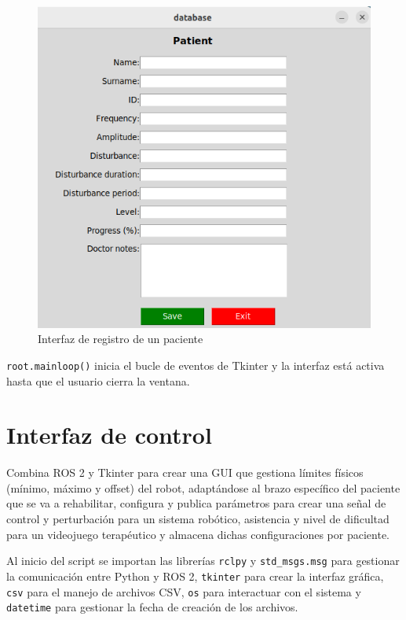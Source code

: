\begin{figure}[ht!]
	\centering
	\begin{minipage}{0.65\linewidth}
		\centering
		\includegraphics[width=\linewidth]{figs/registro.png}
	\end{minipage}
	\caption[Interfaz de registro de un paciente]{Interfaz de registro de un paciente}
	\label{fig:database}
\end{figure}

\verb|root.mainloop()| inicia el bucle de eventos de Tkinter y la interfaz está activa hasta que el usuario cierra la ventana.

\section{Interfaz de control}
\label{section:controller}

Combina ROS 2 y Tkinter para crear una GUI que gestiona límites físicos (mínimo, máximo y offset) del robot, adaptándose al brazo específico del paciente que se va a rehabilitar, configura y publica parámetros para crear una señal de control y perturbación para un sistema robótico, asistencia y nivel de dificultad para un videojuego terapéutico y almacena dichas configuraciones por paciente.

Al inicio del script se importan las librerías \verb|rclpy| y \verb|std_msgs.msg| para gestionar la comunicación entre Python y ROS 2, \verb|tkinter| para crear la interfaz gráfica, \verb|csv| para el manejo de archivos CSV, \verb|os| para interactuar con el sistema y \verb|datetime| para gestionar la fecha de creación de los archivos.


